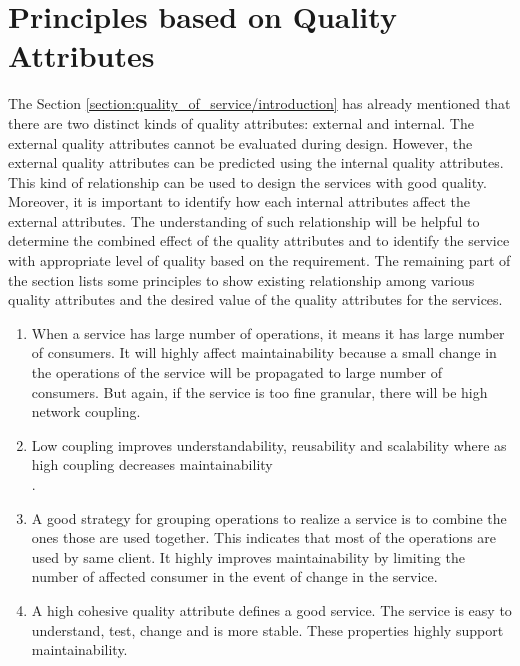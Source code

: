 {{{{{{{{%
\section{Principles based on Quality Attributes}{\label{section:quality_of_service/quality_attributes_principle}
The Section \ref{section:quality_of_service/introduction} has already mentioned that there are two distinct kinds of quality attributes: external and internal. The external quality attributes cannot be evaluated during design. However, the external quality attributes can be predicted using the internal quality attributes. This kind of relationship can be used to design the services with good quality. Moreover, it is important to identify how each internal attributes affect the external attributes. The understanding of such relationship will be helpful to determine the combined effect of the quality attributes and to identify the service with appropriate level of quality based on the requirement.
The remaining part of the section lists some principles to show existing relationship among various quality attributes and the desired value of the quality attributes for the services.
\begin{enumerate}
\item When a service has large number of operations, it means it has large number of consumers. It will highly affect maintainability because a small change in the operations of the service will be propagated to large number of consumers. But again, if the service is too fine granular, there will be high network coupling. \cite{Feuerlicht:2007aa, Xiao-jun:2015aa, Bianco:2007aa}

\item Low coupling improves understandability, reusability and scalability where as high coupling decreases maintainability
\\
\cite{Kazemi:2011aa, Erl:2005aa, Josuttis:2007aa}.

\item A good strategy for grouping operations to realize a service is to combine the ones those are used together.  This indicates that most of the operations are used by same client.  It highly improves maintainability by limiting the number of affected consumer in the event of change in the service. \cite{Xiao-jun:2015aa}

\item A high cohesive quality attribute defines a good service. The service is easy to understand, test, change and is more stable. These properties highly support maintainability. \cite{np:2001aa}


\end{enumerate}}}}}}}}}}
